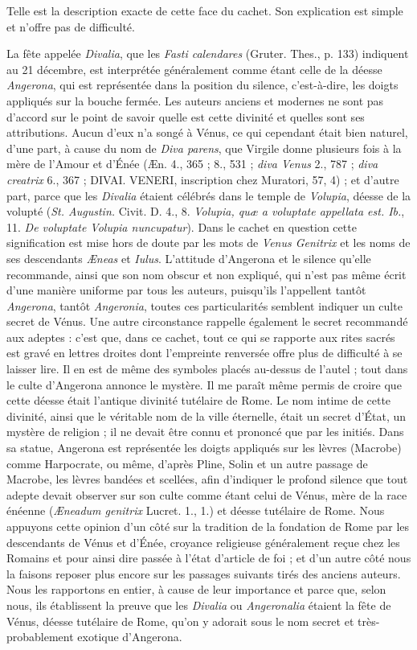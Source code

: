 \documentclass[a4paper, 11pt, oneside, polutonikogreek, french]{article}
\begin{document}
Telle est la description exacte de cette face du cachet. Son explication est simple et n'offre pas de difficulté.

La fête appelée \emph{Divalia}, que les \emph{Fasti calendares} (Gruter. Thes., p. 133) indiquent au 21 décembre, est interprétée généralement comme étant celle de la déesse \emph{Angerona}, qui est représentée dans la position du silence, c'est-à-dire, les doigts appliqués sur la bouche fermée. Les auteurs anciens et modernes ne sont pas d'accord sur le point de savoir quelle est cette divinité et quelles sont ses attributions. Aucun d'eux n'a songé à Vénus, ce qui cependant était bien naturel, d'une part, à cause du nom de \emph{Diva parens}, que Virgile donne plusieurs fois à la mère de l'Amour et d'Énée (Æn. 4., 365 ; 8., 531 ; \emph{diva Venus} 2., 787 ; \emph{diva creatrix} 6., 367 ; DIVAI. VENERI, inscription chez Muratori, 57, 4) ; et d'autre part, parce que les \emph{Divalia} étaient célébrés dans le temple de \emph{Volupia}, déesse de la volupté (\emph{St. Augustin.} Civit. D. 4., 8. \emph{Volupia, quæ a voluptate appellata est. Ib.}, 11. \emph{De voluptate Volupia nuncupatur}). Dans le cachet en question cette signification est mise hors de doute par les mots de \emph{Venus Genitrix} et les noms de ses descendants \emph{Æneas} et \emph{Iulus}. L'attitude d'Angerona et le silence qu'elle recommande, ainsi que son nom obscur et non expliqué, qui n'est pas même écrit d'une manière uniforme par tous les auteurs, puisqu'ils l'appellent tantôt \emph{Angerona}, tantôt \emph{Angeronia}, toutes ces particularités semblent indiquer un culte secret de Vénus. Une autre circonstance rappelle également le secret recommandé aux adeptes : c'est que, dans ce cachet, tout ce qui se rapporte aux rites sacrés est gravé en lettres droites dont l'empreinte renversée offre plus de difficulté à se laisser lire. Il en est de même des symboles placés au-dessus de l'autel ; tout dans le culte d'Angerona annonce le mystère. Il me paraît même permis de croire que cette déesse était l'antique divinité tutélaire de Rome. Le nom intime de cette divinité, ainsi que le véritable nom de la ville éternelle, était un secret d'État, un mystère de religion ; il ne devait être connu et prononcé que par les initiés. Dans sa statue, Angerona est représentée les doigts appliqués sur les lèvres (Macrobe) comme Harpocrate, ou même, d'après Pline, Solin et un autre passage de Macrobe, les lèvres bandées et scellées, afin d'indiquer le profond silence que tout adepte devait observer sur son culte comme étant celui de Vénus, mère de la race énéenne (\emph{Æneadum genitrix} Lucret. 1., 1.) et déesse tutélaire de Rome. Nous appuyons cette opinion d'un côté sur la tradition de la fondation de Rome par les descendants de Vénus et d'Énée, croyance religieuse généralement reçue chez les Romains et pour ainsi dire passée à l'état d'article de foi ; et d'un autre côté nous la faisons reposer plus encore sur les passages suivants tirés des anciens auteurs. Nous les rapportons en entier, à cause de leur importance et parce que, selon nous, ils établissent la preuve que les \emph{Divalia} ou \emph{Angeronalia} étaient la fête de Vénus, déesse tutélaire de Rome, qu'on y adorait sous le nom secret et très-probablement exotique d'Angerona.
\end{document}
